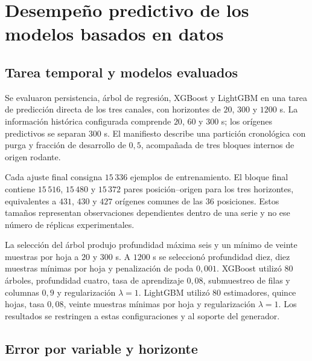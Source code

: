 
\FloatBarrier

\section{Desempeño predictivo de los modelos basados en datos}
\label{res:aprendizaje}

\subsection{Tarea temporal y modelos evaluados}

Se evaluaron persistencia, árbol de regresión, XGBoost y LightGBM en una tarea de predicción directa de los tres canales, con horizontes de $20$, $300$ y $1200$ s. La información histórica configurada comprende $20$, $60$ y $300$ s; los orígenes predictivos se separan $300$ s. El manifiesto describe una partición cronológica con purga y fracción de desarrollo de $0{,}5$, acompañada de tres bloques internos de origen rodante.

Cada ajuste final consigna $15\,336$ ejemplos de entrenamiento. El bloque final contiene $15\,516$, $15\,480$ y $15\,372$ pares posición--origen para los tres horizontes, equivalentes a $431$, $430$ y $427$ orígenes comunes de las $36$ posiciones. Estos tamaños representan observaciones dependientes dentro de una serie y no ese número de réplicas experimentales.

La selección del árbol produjo profundidad máxima seis y un mínimo de veinte muestras por hoja a $20$ y $300$ s. A $1200$ s se seleccionó profundidad diez, diez muestras mínimas por hoja y penalización de poda $0{,}001$. XGBoost utilizó $80$ árboles, profundidad cuatro, tasa de aprendizaje $0{,}08$, submuestreo de filas y columnas $0{,}9$ y regularización $\lambda=1$. LightGBM utilizó $80$ estimadores, quince hojas, tasa $0{,}08$, veinte muestras mínimas por hoja y regularización $\lambda=1$. Los resultados se restringen a estas configuraciones y al soporte del generador.

\subsection{Error por variable y horizonte}

